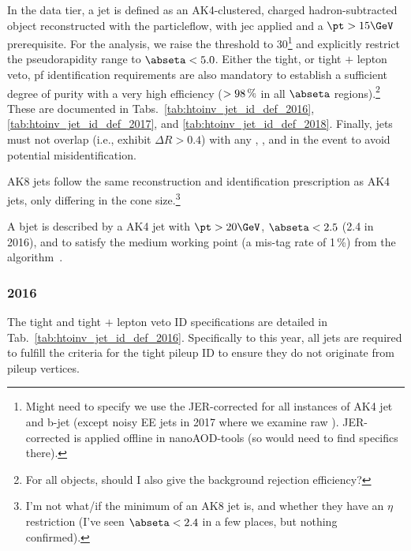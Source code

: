 In the \nanoAOD data tier, a \gls{jet} is defined as an AK4-clustered, charged hadron-subtracted object reconstructed with the \gls{particleflow}, with \acrlong{jec} applied and a $\pt > \text{15}\GeV$ prerequisite. For the analysis, we raise the \pt threshold to 30\GeV\footnote{Might need to specify we use the JER-corrected \pt for all instances of AK4 jet and b-jet \pt (except noisy EE jets in 2017 where we examine raw \pt). JER-corrected \pt is applied offline in nanoAOD-tools (so would need to find specifics there).} and explicitly restrict the pseudorapidity range to $\abseta < 5.0$. Either the tight, or tight $+$ lepton veto, \acrshort{pf} identification requirements are also mandatory to establish a sufficient degree of purity with a very high efficiency ($> \text{98\,\%}$ in all $\abseta$ regions).\footnote{For all objects, should I also give the background rejection efficiency?} These are documented in Tabs.~\ref{tab:htoinv_jet_id_def_2016}, \ref{tab:htoinv_jet_id_def_2017}, and \ref{tab:htoinv_jet_id_def_2018}. Finally, \glspl{jet} must not overlap (i.e., exhibit $\Delta R > \text{0.4}$) with any \vetoEle, \looseMuon, and \loosePhoton in the event to avoid potential misidentification.

AK8 \glspl{jet} follow the same reconstruction and identification prescription as AK4 \glspl{jet}, only differing in the cone size.\footnote{I'm not what/if the minimum \pt of an AK8 \gls{jet} is, and whether they have an $\eta$ restriction (I've seen $\abseta < 2.4$ in a few places, but nothing confirmed).}

A \gls{bjet} is described by a \nanoAOD AK4 \gls{jet} with $\pt > \text{20}\GeV$, $\abseta < \text{2.5}$ (2.4 in 2016), and to satisfy the medium working point (a mis-tag rate of 1\,\%) from the \deepcsv algorithm~\cite{Sirunyan:2017ezt}.




\subsubsection{2016}
\label{subsubsec:htoinv_jet_objs_2016}

The tight and tight $+$ lepton veto ID specifications are detailed in Tab.~\ref{tab:htoinv_jet_id_def_2016}. Specifically to this year, all \glspl{jet} are required to fulfill the criteria for the tight pileup ID to ensure they do not originate from pileup vertices.

